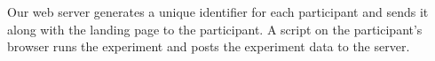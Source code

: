 Our web server generates a unique identifier for each participant and sends it along with the landing page to the participant. 
A script on the participant's browser runs the experiment and posts the experiment data to the server. 





